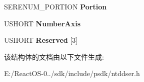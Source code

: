 \begin{DoxyCompactItemize}
S\+E\+R\+E\+N\+U\+M\+\_\+\+P\+O\+R\+T\+I\+ON {\bfseries Portion}
\item 
\mbox{\label{struct___s_e_r_e_n_u_m___p_o_r_t___p_a_r_a_m_e_t_e_r_s_aac01ee2fa1f9c5ff2211c2e36643d2e0}} 
U\+S\+H\+O\+RT {\bfseries Number\+Axis}
\item 
\mbox{\label{struct___s_e_r_e_n_u_m___p_o_r_t___p_a_r_a_m_e_t_e_r_s_a11020fd497897559b0fa8e711f73595c}} 
U\+S\+H\+O\+RT {\bfseries Reserved} \mbox{[}3\mbox{]}
\end{DoxyCompactItemize}


该结构体的文档由以下文件生成\+:\begin{DoxyCompactItemize}
\item 
E\+:/\+React\+O\+S-\/0../sdk/include/psdk/ntddser.\+h\end{DoxyCompactItemize}
